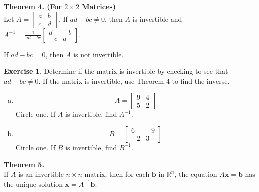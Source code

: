 \documentclass[10pt]{book}
\newcommand{\boxcolor}{gray!30}
\newenvironment{boxthm}{\begin{mdframed}[backgroundcolor=\boxcolor,nobreak=true]}{\end{mdframed}}
\theoremstyle{definition}
\newtheorem{exercise}{Exercise}[section]
\newcommand{\R}{\mathbb{R}}
\newcommand{\vect}[1]{\ensuremath{\boldsymbol{\mathbf{#1}}}}
\newcommand{\Axb}{A\vect{x}=\vect{b}}
\begin{document}
\begin{boxthm}
	\textbf{Theorem 4. (For $2\times 2$ Matrices)} \\
	Let $A=\begin{bmatrix}a&b\\c&d\end{bmatrix}$. If $ad-bc\neq 0$, then $A$ is invertible and
	$ A^{-1} = \frac{1}{ad-bc}\begin{bmatrix}d&-b\\-c&a\end{bmatrix}.$ \par
	If $ad-bc=0$, then $A$ is not invertible.
\end{boxthm}

\begin{exercise} %
	Determine if the matrix is invertible by checking to see that $ad-bc\neq 0$. If the matrix is invertible, use Theorem 4 to find the inverse.
	\begin{multicols}{2}
		\begin{enumerate}[(a)]
			\item $$A=\begin{bmatrix}9&4\\5&2\end{bmatrix}$$
			Circle one. If $A$ is invertible, find $A^{-1}$.
			\begin{center}
				 \hspace{5em}
			\end{center}
			
			\item $$B=\begin{bmatrix}6&-9\\-2&3\end{bmatrix}$$
			Circle one. If $B$ is invertible, find $B^{-1}$.
			\begin{center}
				 \hspace{5em}
			\end{center}
		\end{enumerate}
	\end{multicols}
\end{exercise}
\vfill


\begin{boxthm}
	\textbf{Theorem 5.} \\
	If $A$ is an invertible $n\times n$ matrix, then for each $\vect{b}$ in $\R^n$, the equation $\Axb$ has the unique solution $\vect{x}=A^{-1}\vect{b}$.
\end{boxthm}
\end{document}
